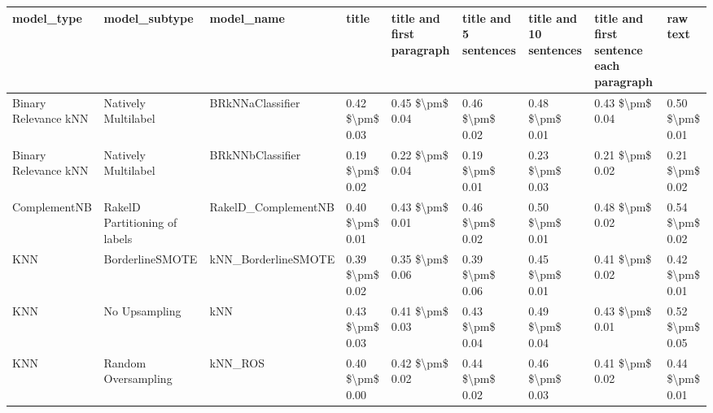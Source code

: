 \begin{tabular}{lllllllll}
\toprule
                     model\_type &                 model\_subtype &                                   model\_name &           title & title and first paragraph & title and 5 sentences & title and 10 sentences & title and first sentence each paragraph &            raw text \\
\midrule
           Binary Relevance kNN &           Natively Multilabel &                             BRkNNaClassifier & 0.42 \$\textbackslash pm\$ 0.03 &           0.45 \$\textbackslash pm\$ 0.04 &       0.46 \$\textbackslash pm\$ 0.02 &        0.48 \$\textbackslash pm\$ 0.01 &                         0.43 \$\textbackslash pm\$ 0.04 &     0.50 \$\textbackslash pm\$ 0.01 \\
           Binary Relevance kNN &           Natively Multilabel &                             BRkNNbClassifier & 0.19 \$\textbackslash pm\$ 0.02 &           0.22 \$\textbackslash pm\$ 0.04 &       0.19 \$\textbackslash pm\$ 0.01 &        0.23 \$\textbackslash pm\$ 0.03 &                         0.21 \$\textbackslash pm\$ 0.02 &     0.21 \$\textbackslash pm\$ 0.02 \\
                   ComplementNB & RakelD Partitioning of labels &                          RakelD\_ComplementNB & 0.40 \$\textbackslash pm\$ 0.01 &           0.43 \$\textbackslash pm\$ 0.01 &       0.46 \$\textbackslash pm\$ 0.02 &        0.50 \$\textbackslash pm\$ 0.01 &                         0.48 \$\textbackslash pm\$ 0.02 &     0.54 \$\textbackslash pm\$ 0.02 \\
                            KNN &               BorderlineSMOTE &                          kNN\_BorderlineSMOTE & 0.39 \$\textbackslash pm\$ 0.02 &           0.35 \$\textbackslash pm\$ 0.06 &       0.39 \$\textbackslash pm\$ 0.06 &        0.45 \$\textbackslash pm\$ 0.01 &                         0.41 \$\textbackslash pm\$ 0.02 &     0.42 \$\textbackslash pm\$ 0.01 \\
                            KNN &                 No Upsampling &                                          kNN & 0.43 \$\textbackslash pm\$ 0.03 &           0.41 \$\textbackslash pm\$ 0.03 &       0.43 \$\textbackslash pm\$ 0.04 &        0.49 \$\textbackslash pm\$ 0.04 &                         0.43 \$\textbackslash pm\$ 0.01 &     0.52 \$\textbackslash pm\$ 0.05 \\
                            KNN &           Random Oversampling &                                      kNN\_ROS & 0.40 \$\textbackslash pm\$ 0.00 &           0.42 \$\textbackslash pm\$ 0.02 &       0.44 \$\textbackslash pm\$ 0.02 &        0.46 \$\textbackslash pm\$ 0.03 &                         0.41 \$\textbackslash pm\$ 0.02 &     0.44 \$\textbackslash pm\$ 0.01 \\

\end{tabular}
